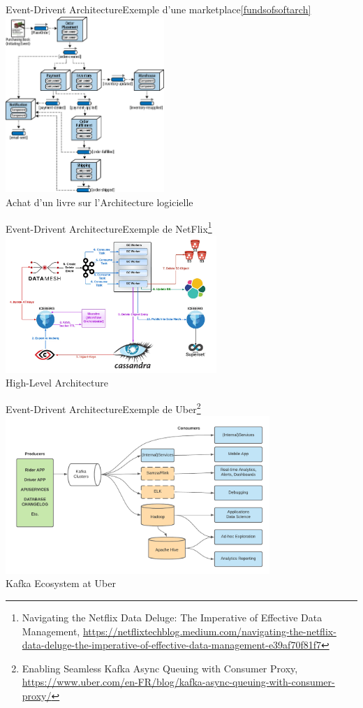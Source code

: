 \documentclass{beamer}
\begin{document}
    \begin{frame}{Event-Drivent Architecture}{Exemple d'une marketplace\cref{fundsofsoftarch}}
        \centering
        \includegraphics[width=6cm]{image/event-driven-example} \\ Achat d'un livre sur l'Architecture logicielle \\
    \end{frame}

    \begin{frame}{Event-Drivent Architecture}{Exemple de NetFlix\footnote{Navigating the Netflix Data Deluge: The Imperative of Effective Data Management, \url{https://netflixtechblog.medium.com/navigating-the-netflix-data-deluge-the-imperative-of-effective-data-management-e39af70f81f7}}}
        \centering
        \includegraphics[width=8cm]{image/netflix-data-deluge} \\ High-Level Architecture \\
    \end{frame}

    \begin{frame}{Event-Drivent Architecture}{Exemple de Uber\footnote{Enabling Seamless Kafka Async Queuing with Consumer Proxy, \url{https://www.uber.com/en-FR/blog/kafka-async-queuing-with-consumer-proxy/}}}
        \centering
        \includegraphics[width=10cm]{image/uber-kafka} \\ Kafka Ecosystem at Uber \\
    \end{frame}
\end{document}
